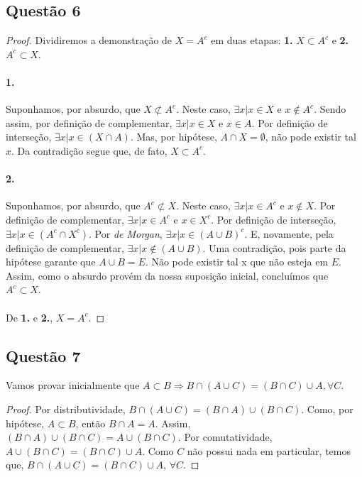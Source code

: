 \documentclass[11pt,a4paper]{report}
\begin{document}
    \subsection{Questão 6}
    \begin{proof}
    Dividiremos a demonstração de $X = A^c$ em duas etapas: \textbf{1.} $X \subset A^c$ e \textbf{2.} $A^c \subset X$.

    \paragraph{1.}
    Suponhamos, por absurdo, que $X \not\subset A^c$. Neste caso, $\exists x | x \in X $ e $x \not\in A^c$. Sendo assim, por definição de complementar, $\exists x | x \in X$ e $x \in A$. Por definição de interseção, $\exists x | x \in (X \cap A)$. Mas, por hipótese, $A \cap X = \emptyset$, não pode existir tal $x$. Da contradição segue que, de fato, $X \subset A^c$.

    \paragraph{2.}
    Suponhamos, por absurdo, que $A^c \not\subset X$. Neste caso, $\exists x | x \in A^c$ e $x \not\in X$. Por definição de complementar, $\exists x | x \in A^c$ e $x \in X^c$. Por definição de interseção, $\exists x | x \in (A^c \cap X^c)$. Por \textit{de Morgan}, $\exists x | x \in (A \cup B)^c$. E, novamente, pela definição de complementar, $\exists x | x \not\in (A \cup B)$. Uma contradição, pois parte da hipótese garante que $A \cup B = E$. Não pode existir tal x que não esteja em $E$. Assim, como o absurdo provém da nossa suposição inicial, concluímos que $A^c \subset X$.

    \paragraph{}
    De \textbf{1.} e \textbf{2.}, $X = A^c$.
    \end{proof}


    \subsection{Questão 7}
    Vamos provar inicialmente que $A \subset B \Rightarrow B \cap (A \cup C) = (B \cap C) \cup A, \forall C$.

    \begin{proof}
    Por distributividade, $B \cap (A \cup C) = (B \cap A) \cup (B \cap C)$. Como, por hipótese, $A \subset B$, então $B \cap A = A$. Assim, $(B \cap A) \cup (B \cap C) = A \cup (B \cap C)$. Por comutatividade, $A \cup (B \cap C) = (B \cap C) \cup A$. Como $C$ não possui nada em particular, temos que, $B \cap (A \cup C) = (B \cap C) \cup A$, $\forall C$.
    \end{proof}
\end{document}
